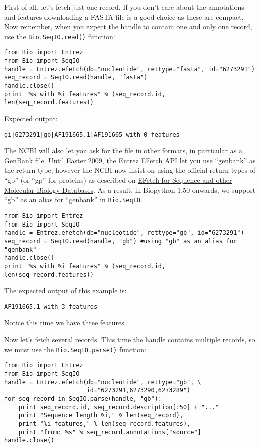 \documentclass{report}
\begin{document}
First of all, let's fetch just one record.  If you don't care about the
annotations and features downloading a FASTA file is a good choice as these
are compact.  Now remember, when you expect the handle to contain one and
only one record, use the \verb|Bio.SeqIO.read()| function:

\begin{verbatim}
from Bio import Entrez
from Bio import SeqIO
handle = Entrez.efetch(db="nucleotide", rettype="fasta", id="6273291")
seq_record = SeqIO.read(handle, "fasta")
handle.close()
print "%s with %i features" % (seq_record.id, len(seq_record.features))
\end{verbatim}

\noindent Expected output:

\begin{verbatim}
gi|6273291|gb|AF191665.1|AF191665 with 0 features
\end{verbatim}

The NCBI will also let you ask for the file in other formats, in particular as
a GenBank file. Until Easter 2009, the Entrez EFetch API let you use ``genbank''
as the return type, however the NCBI now insist on using the official
return types of ``gb'' (or ``gp'' for proteins) as described on
\href{http://www.ncbi.nlm.nih.gov/entrez/query/static/efetchseq_help.html}
{EFetch for Sequence and other Molecular Biology Databases}.
As a result, in Biopython 1.50 onwards, we support ``gb'' as an
alias for ``genbank'' in \verb|Bio.SeqIO|.

\begin{verbatim}
from Bio import Entrez
from Bio import SeqIO
handle = Entrez.efetch(db="nucleotide", rettype="gb", id="6273291")
seq_record = SeqIO.read(handle, "gb") #using "gb" as an alias for "genbank"
handle.close()
print "%s with %i features" % (seq_record.id, len(seq_record.features))
\end{verbatim}

\noindent The expected output of this example is:

\begin{verbatim}
AF191665.1 with 3 features
\end{verbatim}

\noindent Notice this time we have three features.

Now let's fetch several records.  This time the handle contains multiple records,
so we must use the \verb|Bio.SeqIO.parse()| function:

\begin{verbatim}
from Bio import Entrez
from Bio import SeqIO
handle = Entrez.efetch(db="nucleotide", rettype="gb", \
                       id="6273291,6273290,6273289")
for seq_record in SeqIO.parse(handle, "gb"):
    print seq_record.id, seq_record.description[:50] + "..."
    print "Sequence length %i," % len(seq_record),
    print "%i features," % len(seq_record.features),
    print "from: %s" % seq_record.annotations["source"]
handle.close()
\end{verbatim}
\end{document}
